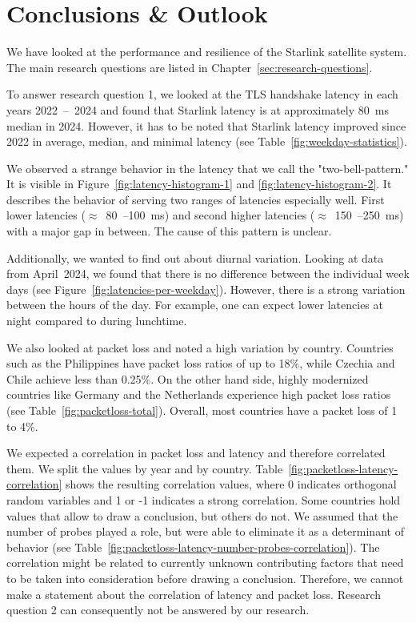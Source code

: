 \chapter{Conclusions \& Outlook} \label{sec:conclusion}

We have looked at the performance and resilience of the Starlink satellite
system. The main research questions are listed in
Chapter~\ref{sec:research-questions}.

To answer research question 1, we looked at the TLS handshake latency in each
years 2022~--~2024 and found that Starlink latency is at approximately 80~ms
median in 2024. However, it has to be noted that Starlink latency improved
since 2022 in average, median, and minimal latency (see
Table~\ref{fig:weekday-statistics}).

We observed a strange behavior in the latency that we call the
"two-bell-pattern." It is visible in Figure~\ref{fig:latency-histogram-1} and
\ref{fig:latency-histogram-2}. It describes the behavior of serving two ranges
of latencies especially well. First lower latencies ($\approx$~80~--100~ms) and
second higher latencies ($\approx$~150~--250~ms) with a major gap in between.
The cause of this pattern is unclear.

Additionally, we wanted to find out about diurnal variation. Looking at data
from April~2024, we found that there is no difference between the individual
week days (see Figure~\ref{fig:latencies-per-weekday}). However, there is a
strong variation between the hours of the day. For example, one can expect
lower latencies at night compared to during lunchtime.

We also looked at packet loss and noted a high variation by country. Countries
such as the Philippines have packet loss ratios of up to 18\%, while Czechia
and Chile achieve less than 0.25\%. On the other hand side, highly modernized
countries like Germany and the Netherlands experience high packet loss ratios
(see Table~\ref{fig:packetloss-total}). Overall, most countries have a packet
loss of 1 to 4\%.

We expected a correlation in packet loss and latency and therefore correlated
them. We split the values by year and by country.
Table~\ref{fig:packetloss-latency-correlation} shows the resulting correlation
values, where 0 indicates orthogonal random variables and 1 or -1 indicates a
strong correlation. Some countries hold values that allow to draw a conclusion,
but others do not. We assumed that the number of probes played a role, but were
able to eliminate it as a determinant of behavior (see
Table~\ref{fig:packetloss-latency-number-probes-correlation}). The correlation
might be related to currently unknown contributing factors that need to be
taken into consideration before drawing a conclusion. Therefore, we cannot make
a statement about the correlation of latency and packet loss. Research question
2 can consequently not be answered by our research.

